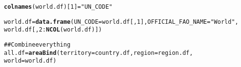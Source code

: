 \documentclass{article}\usepackage{graphicx, color}
\makeatletter
\newcommand{\hlfunctioncall}[1]{\textcolor[rgb]{0.501960784313725,0,0.329411764705882}{\textbf{#1}}}%
\newcommand{\hlstring}[1]{\textcolor[rgb]{0.6,0.6,1}{#1}}%
\newcommand{\hlcomment}[1]{\textcolor[rgb]{0.180392156862745,0.6,0.341176470588235}{#1}}%
\newenvironment{kframe}{%
 \def\at@end@of@kframe{}%
 \ifinner\ifhmode%
  \def\at@end@of@kframe{\end{minipage}}%
  \begin{minipage}{\columnwidth}%
 \fi\fi%
 \def\FrameCommand##1{\hskip\@totalleftmargin \hskip-\fboxsep
 \colorbox{shadecolor}{##1}\hskip-\fboxsep
     \hskip-\linewidth \hskip-\@totalleftmargin \hskip\columnwidth}%
 \MakeFramed {\advance\hsize-\width
   \@totalleftmargin\z@ \linewidth\hsize
   \@setminipage}}%
 {\par\unskip\endMakeFramed%
 \at@end@of@kframe}
\newenvironment{knitrout}{}{} %
\makeatother
\begin{document}
\begin{knitrout}
\begin{kframe}
{\ttfamily\noindent\bfseries\color{errorcolor}{\#\# Error: object 'con.df' not found}}\begin{alltt}

\hlfunctioncall{colnames}(world.df)[1] = \hlstring{"UN_CODE"}
\end{alltt}


{\ttfamily\noindent\bfseries\color{errorcolor}{\#\# Error: object 'world.df' not found}}\begin{alltt}

world.df = \hlfunctioncall{data.frame}(UN_CODE = world.df[, 1], OFFICIAL_FAO_NAME = \hlstring{"World"},
                      world.df[, 2:\hlfunctioncall{NCOL}(world.df)])
\end{alltt}


{\ttfamily\noindent\bfseries\color{errorcolor}{\#\# Error: object 'world.df' not found}}\begin{alltt}

\hlcomment{## Combine everything}
all.df = \hlfunctioncall{areaBind}(territory = country.df, region = region.df,
    world = world.df)
\end{alltt}


{\ttfamily\noindent\bfseries\color{errorcolor}{\#\# Error: could not find function "areaBind"}}\end{kframe}
\end{knitrout}







\end{document}
